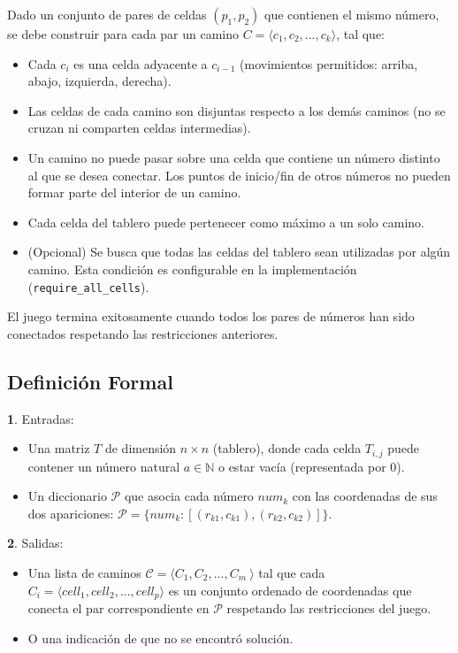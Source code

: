 \documentclass[spanish]{article}
\numberwithin{equation}{section}
\numberwithin{figure}{section}
\theoremstyle{definition}
\newtheorem*{defn*}{\protect\definitionname}
\begin{document}
Dado un conjunto de pares de celdas $(p_1, p_2)$ que contienen el mismo número, se debe construir para cada par un camino $C = \langle c_1, c_2, ..., c_k \rangle$, tal que:

\begin{itemize}
    \item Cada $c_i$ es una celda adyacente a $c_{i-1}$ (movimientos permitidos: arriba, abajo, izquierda, derecha).
    \item Las celdas de cada camino son disjuntas respecto a los demás caminos (no se cruzan ni comparten celdas intermedias).
    \item Un camino no puede pasar sobre una celda que contiene un número distinto al que se desea conectar. Los puntos de inicio/fin de otros números no pueden formar parte del interior de un camino.
    \item Cada celda del tablero puede pertenecer como máximo a un solo camino.
    \item (Opcional) Se busca que todas las celdas del tablero sean utilizadas por algún camino. Esta condición es configurable en la implementación (\texttt{require\_all\_cells}).
\end{itemize}
El juego termina exitosamente cuando todos los pares de números han sido conectados respetando las restricciones anteriores.

\subsection{Definición Formal}
\begin{defn*}
    Entradas:
\end{defn*}
\begin{itemize}
    \item Una matriz $T$ de dimensión $n \times n$ (tablero), donde cada celda $T_{i,j}$ puede contener un número natural $a \in \mathbb{N}$ o estar vacía (representada por 0).
    \item Un diccionario $\mathcal{P}$ que asocia cada número $num_k$ con las coordenadas de sus dos apariciones: $\mathcal{P} = \{num_k: [(r_{k1}, c_{k1}), (r_{k2}, c_{k2})] \}$.
\end{itemize}

\begin{defn*}
    Salidas:
\end{defn*}
\begin{itemize}
    \item Una lista de caminos $\mathcal{C} = \langle C_1, C_2, ..., C_m\ \rangle $ tal que cada $C_i = \langle cell_1, cell_2, ..., cell_p \rangle$ es un conjunto ordenado de coordenadas que conecta el par correspondiente en $\mathcal{P}$ respetando las restricciones del juego.
    \item O una indicación de que no se encontró solución.
\end{itemize}
\end{document}
